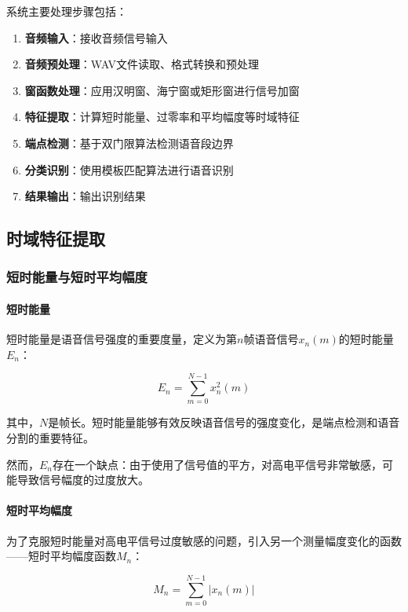 \documentclass[sigconf,nonacm]{acmart}
\begin{document}
系统主要处理步骤包括：

\begin{enumerate}
\item \textbf{音频输入}：接收音频信号输入
\item \textbf{音频预处理}：WAV文件读取、格式转换和预处理
\item \textbf{窗函数处理}：应用汉明窗、海宁窗或矩形窗进行信号加窗
\item \textbf{特征提取}：计算短时能量、过零率和平均幅度等时域特征
\item \textbf{端点检测}：基于双门限算法检测语音段边界
\item \textbf{分类识别}：使用模板匹配算法进行语音识别
\item \textbf{结果输出}：输出识别结果
\end{enumerate}


\subsection{时域特征提取}

\subsubsection{短时能量与短时平均幅度}

\paragraph{短时能量}

短时能量是语音信号强度的重要度量，定义为第$n$帧语音信号$x_n(m)$的短时能量$E_n$：

\begin{equation}
E_n = \sum_{m=0}^{N-1} x_n^2(m)
\end{equation}

其中，$N$是帧长。短时能量能够有效反映语音信号的强度变化，是端点检测和语音分割的重要特征。

然而，$E_n$存在一个缺点：由于使用了信号值的平方，对高电平信号非常敏感，可能导致信号幅度的过度放大。

\paragraph{短时平均幅度}

为了克服短时能量对高电平信号过度敏感的问题，引入另一个测量幅度变化的函数——短时平均幅度函数$M_n$：

\begin{equation}
M_n = \sum_{m=0}^{N-1} |x_n(m)|
\end{equation}
\end{document}
